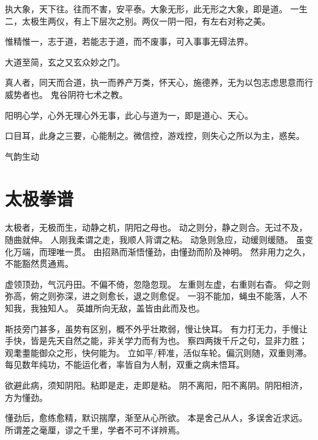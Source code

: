 执大象，天下往。往而不害，安平泰。大象无形，此无形之大象，即是道。
一生二，太极生两仪，有上下层次之别。两仪一阴一阳，有左右对称之美。

惟精惟一，志于道，若能志于道，而不废事，可入事事无碍法界。

大道至简，玄之又玄众妙之门。

真人者，同天而合道，执一而养产万类，怀天心，施德养，无为以包志虑思意而行威势者也。
鬼谷阴符七术之教。

阳明心学，心外无理心外无事，此心与道为一，即是道心、天心。

口目耳，此身之三要，心能制之。微信控，游戏控，则失心之所以为主，惑矣。

气韵生动

\section{太极拳谱}

太极者，无极而生，动静之机，阴阳之母也。
动之则分，静之则合。无过不及，随曲就伸。
人刚我柔谓之走，我顺人背谓之粘。
动急则急应，动缓则缓随。
虽变化万端，而理唯一贯。
由招熟而渐悟懂劲，由懂劲而阶及神明。
然非用力之久，不能豁然贯通焉。

虚领顶劲，气沉丹田。不偏不倚，忽隐忽现。
左重则左虚，右重则右杳。
仰之则弥高，俯之则弥深，进之则愈长，退之则愈促。
一羽不能加，蝇虫不能落，人不知我，我独知人。
英雄所向无敌，盖皆由此而及也。

斯技旁门甚多，虽势有区别，概不外乎壮欺弱，慢让快耳。
有力打无力，手慢让手快，皆是先天自然之能，非关学力而有为也。
察四两拨千斤之句，显非力胜；观耄耋能御众之形，快何能为。
立如平/秤准，活似车轮。偏沉则随，双重则滞。
每见数年纯功，不能运化者，率皆自为人制，双重之病未悟耳。

欲避此病，须知阴阳。粘即是走，走即是粘。
阴不离阳，阳不离阴。阴阳相济，方为懂劲。

懂劲后，愈练愈精，默识揣摩，渐至从心所欲。
本是舍己从人，多误舍近求远。
所谓差之毫厘，谬之千里，学者不可不详辨焉。
